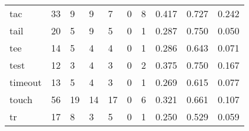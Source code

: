 \begin{longtable}{lp{2.0cm}p{2.0cm}p{2.0cm}p{2.0cm}p{2.0cm}p{2.0cm}p{2.0cm}p{2.0cm}p{2.0cm}}
tac       &                     33 &                                             9 &                                            9 &                                           7 &                                            0 &                                          8 &                                0.417 &                                  0.727 &                                0.242 \\
tail      &                     20 &                                             5 &                                            9 &                                           5 &                                            0 &                                          1 &                                0.287 &                                  0.750 &                                0.050 \\
tee       &                     14 &                                             5 &                                            4 &                                           4 &                                            0 &                                          1 &                                0.286 &                                  0.643 &                                0.071 \\
test      &                     12 &                                             3 &                                            4 &                                           3 &                                            0 &                                          2 &                                0.375 &                                  0.750 &                                0.167 \\
timeout   &                     13 &                                             5 &                                            4 &                                           3 &                                            0 &                                          1 &                                0.269 &                                  0.615 &                                0.077 \\
touch     &                     56 &                                            19 &                                           14 &                                          17 &                                            0 &                                          6 &                                0.321 &                                  0.661 &                                0.107 \\
tr        &                     17 &                                             8 &                                            3 &                                           5 &                                            0 &                                          1 &                                0.250 &                                  0.529 &                                0.059 \\

\end{longtable}
